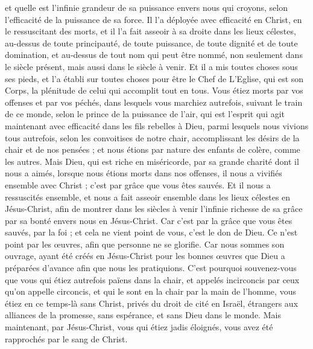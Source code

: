 \begin{multicols}{2}
et quelle est l’infinie grandeur de sa puissance envers nous qui croyons, selon l’efficacité de la puissance de sa force.
Il l’a déployée avec efficacité en Christ, en le ressuscitant des morts, et il l’a fait asseoir à sa droite dans les lieux célestes,
au-dessus de toute principauté, de toute puissance, de toute dignité et de toute domination, et au-dessus de tout nom qui peut être nommé, non seulement dans le siècle présent, mais aussi dans le siècle à venir.
Et il a mis toutes choses sous ses pieds, et l'a établi sur toutes choses pour être le Chef de L’Eglise,
qui est son Corps, la plénitude de celui qui accomplit tout en tous.
\VerseOne{}Vous étiez morts par vos offenses et par vos péchés,
dans lesquels vous marchiez autrefois, suivant le train de ce monde, selon le prince de la puissance de l'air, qui est l'esprit qui agit maintenant avec efficacité dans les fils rebelles à Dieu,
parmi lesquels nous vivions tous autrefois, selon les convoitises de notre chair, accomplissant les désirs de la chair et de nos pensées ; et nous étions par nature des enfants de colère, comme les autres.
Mais Dieu, qui est riche en miséricorde, par sa grande charité dont il nous a aimés,
lorsque nous étions morts dans nos offenses, il nous a vivifiés ensemble avec Christ ; c’est par grâce que vous êtes sauvés.
Et il nous a ressuscités ensemble, et nous a fait asseoir ensemble dans les lieux célestes en Jésus-Christ,
afin de montrer dans les siècles à venir l’infinie richesse de sa grâce par sa bonté envers nous en Jésus-Christ.
Car c’est par la grâce que vous êtes sauvés, par la foi ; et cela ne vient point de vous, c'est le don de Dieu.
Ce n’est point par les œuvres, afin que personne ne se glorifie.
Car nous sommes son ouvrage, ayant été créés en Jésus-Christ pour les bonnes œuvres que Dieu a préparées d’avance afin que nous les pratiquions.
C'est pourquoi souvenez-vous que vous qui étiez autrefois païens dans la chair, et appelés incirconcis par ceux qu’on appelle circoncis, et qui le sont en la chair par la main de l’homme,
vous étiez en ce temps-là sans Christ, privés du droit de cité en Israël, étrangers aux alliances de la promesse, sans espérance, et sans Dieu dans le monde.
Mais maintenant, par Jésus-Christ, vous qui étiez jadis éloignés, vous avez été rapprochés par le sang de Christ.

\end{multicols}
